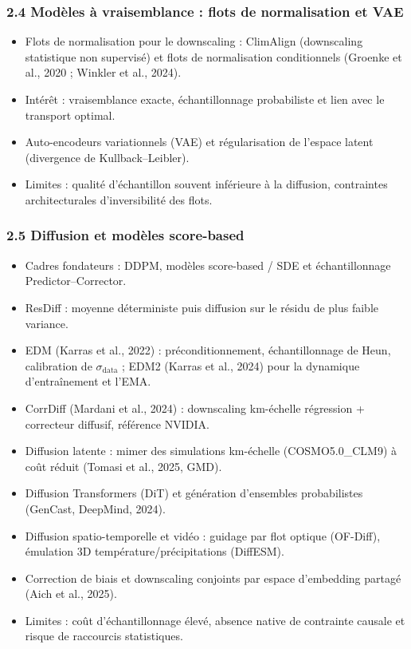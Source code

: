 \documentclass[12pt,a4paper]{article}
\begin{document}
\subsubsection*{2.4 Mod\`eles \`a vraisemblance : flots de normalisation et VAE}
\begin{itemize}
    \item Flots de normalisation pour le downscaling : ClimAlign (downscaling statistique non supervis\'e) et flots de normalisation conditionnels (Groenke et al., 2020 ; Winkler et al., 2024).
    \item Int\'er\^et : vraisemblance exacte, \'echantillonnage probabiliste et lien avec le transport optimal.
    \item Auto-encodeurs variationnels (VAE) et r\'egularisation de l'espace latent (divergence de Kullback--Leibler).
    \item Limites : qualit\'e d'\'echantillon souvent inf\'erieure \`a la diffusion, contraintes architecturales d'inversibilit\'e des flots.
\end{itemize}

\subsubsection*{2.5 Diffusion et mod\`eles score-based}
\begin{itemize}
    \item Cadres fondateurs : DDPM, mod\`eles score-based / SDE et \'echantillonnage Predictor--Corrector.
    \item ResDiff : moyenne d\'eterministe puis diffusion sur le r\'esidu de plus faible variance.
    \item EDM (Karras et al., 2022) : pr\'econditionnement, \'echantillonnage de Heun, calibration de $\sigma_{\mathrm{data}}$ ; EDM2 (Karras et al., 2024) pour la dynamique d'entra\^inement et l'EMA.
    \item CorrDiff (Mardani et al., 2024) : downscaling km-\'echelle r\'egression + correcteur diffusif, r\'ef\'erence NVIDIA.
    \item Diffusion latente : mimer des simulations km-\'echelle (COSMO5.0\_CLM9) \`a co\^ut r\'eduit (Tomasi et al., 2025, GMD).
    \item Diffusion Transformers (DiT) et g\'en\'eration d'ensembles probabilistes (GenCast, DeepMind, 2024).
    \item Diffusion spatio-temporelle et vid\'eo : guidage par flot optique (OF-Diff), \'emulation 3D temp\'erature/pr\'ecipitations (DiffESM).
    \item Correction de biais et downscaling conjoints par espace d'embedding partag\'e (Aich et al., 2025).
    \item Limites : co\^ut d'\'echantillonnage \'elev\'e, absence native de contrainte causale et risque de raccourcis statistiques.
\end{itemize}
\end{document}
